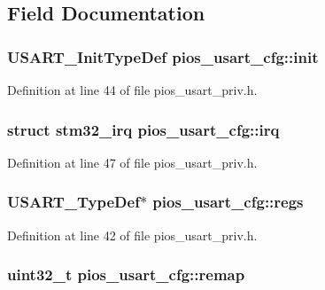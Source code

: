\subsection{\-Field \-Documentation}
\hypertarget{structpios__usart__cfg_a20bd842c61ef010b8bfcf2cc42c19d1a}{
\subsubsection[{init}]{\setlength{\rightskip}{0pt plus 5cm}\-U\-S\-A\-R\-T\-\_\-\-Init\-Type\-Def {\bf pios\-\_\-usart\-\_\-cfg\-::init}}}\label{structpios__usart__cfg_a20bd842c61ef010b8bfcf2cc42c19d1a}


\-Definition at line 44 of file pios\-\_\-usart\-\_\-priv.\-h.

\hypertarget{structpios__usart__cfg_aa2e41bd55618914f579729a722e2133e}{
\subsubsection[{irq}]{\setlength{\rightskip}{0pt plus 5cm}struct {\bf stm32\-\_\-irq} {\bf pios\-\_\-usart\-\_\-cfg\-::irq}}}\label{structpios__usart__cfg_aa2e41bd55618914f579729a722e2133e}


\-Definition at line 47 of file pios\-\_\-usart\-\_\-priv.\-h.

\hypertarget{structpios__usart__cfg_a28b475a517c9d2fee0ab1a87d3c6ca67}{
\subsubsection[{regs}]{\setlength{\rightskip}{0pt plus 5cm}\-U\-S\-A\-R\-T\-\_\-\-Type\-Def$\ast$ {\bf pios\-\_\-usart\-\_\-cfg\-::regs}}}\label{structpios__usart__cfg_a28b475a517c9d2fee0ab1a87d3c6ca67}


\-Definition at line 42 of file pios\-\_\-usart\-\_\-priv.\-h.

\hypertarget{structpios__usart__cfg_a811f7d8ba9be86fdade5aedee961ebb2}{
\subsubsection[{remap}]{\setlength{\rightskip}{0pt plus 5cm}uint32\-\_\-t {\bf pios\-\_\-usart\-\_\-cfg\-::remap}}}\label{structpios__usart__cfg_a811f7d8ba9be86fdade5aedee961ebb2}



